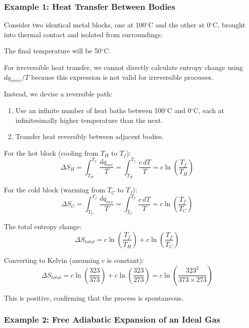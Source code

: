 \documentclass{article}
\theoremstyle{definition}
\begin{document}
\subsubsection{Example 1: Heat Transfer Between Bodies}

Consider two identical metal blocks, one at 100$^\circ$C and the other at 0$^\circ$C, brought into thermal contact and isolated from surroundings.

The final temperature will be 50$^\circ$C.

For irreversible heat transfer, we cannot directly calculate entropy change using $dq_{irrev}/T$ because this expression is not valid for irreversible processes.

Instead, we devise a reversible path:
\begin{enumerate}
    \item Use an infinite number of heat baths between 100$^\circ$C and 0$^\circ$C, each at infinitesimally higher temperature than the next.
    \item Transfer heat reversibly between adjacent bodies.
\end{enumerate}

For the hot block (cooling from $T_H$ to $T_f$):
\begin{equation}
\Delta S_H = \int_{T_H}^{T_f} \frac{dq_{rev}}{T} = \int_{T_H}^{T_f} \frac{c \, dT}{T} = c \ln\left(\frac{T_f}{T_H}\right)
\end{equation}

For the cold block (warming from $T_C$ to $T_f$):
\begin{equation}
\Delta S_C = \int_{T_C}^{T_f} \frac{dq_{rev}}{T} = \int_{T_C}^{T_f} \frac{c \, dT}{T} = c \ln\left(\frac{T_f}{T_C}\right)
\end{equation}

The total entropy change:
\begin{equation}
\Delta S_{total} = c \ln\left(\frac{T_f}{T_H}\right) + c \ln\left(\frac{T_f}{T_C}\right)
\end{equation}

Converting to Kelvin (assuming $c$ is constant):
\begin{equation}
\Delta S_{total} = c \ln\left(\frac{323}{373}\right) + c \ln\left(\frac{323}{273}\right) = c \ln\left(\frac{323^2}{373 \times 273}\right)
\end{equation}

This is positive, confirming that the process is spontaneous.

\subsubsection{Example 2: Free Adiabatic Expansion of an Ideal Gas}
\end{document}
